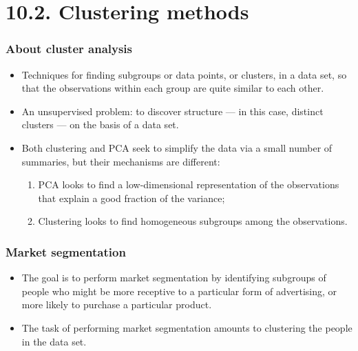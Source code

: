 \documentclass{beamer}
\begin{document}
 \section{10.2. Clustering methods}
 
   \begin{frame}
   	\frametitle{ About cluster analysis}
   	\begin{itemize}
   		
   		\item 
   		Techniques for finding subgroups or data points, or
   		clusters, in a data set, so that the observations within
   		each group are quite similar to each other. 
   		\item An unsupervised problem:   to discover
   		structure --- in this case, distinct clusters --- on the basis of a data set.
   		 \item 
   		Both clustering and PCA seek to simplify the data via a small number
   		of summaries, but their mechanisms are different:
   		\begin{enumerate}
   			\item PCA looks to find a low-dimensional representation of the observations
   			that explain a good fraction of the variance;
   		\item Clustering looks to find homogeneous subgroups among the observations.
   		 
   		\end{enumerate}
   		
   		  	\end{itemize}
   		  \end{frame}    
   		  
   		 
   		  
   		  \begin{frame}
   		  	\frametitle{ Market segmentation}
   		  	\begin{itemize}
   		 \item The goal is to perform market segmentation by identifying
   		subgroups of people who might be more receptive to a particular form
   		of advertising, or more likely to purchase a particular product. 
   		
   		\item The task of
   		performing market segmentation amounts to clustering the people in the
   		data set.
   	      		
   	      	\end{itemize}
   	      \end{frame}    
   	      
\end{document}
